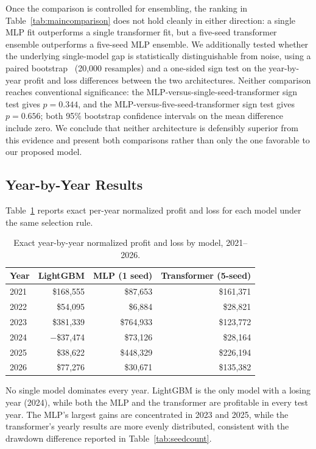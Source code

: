 \documentclass[sigconf,review,anonymous]{acmart}
\begin{document}
Once the comparison is controlled for ensembling, the ranking in Table~\ref{tab:maincomparison} does not hold cleanly in either direction: a single MLP fit outperforms a single transformer fit, but a five-seed transformer ensemble outperforms a five-seed MLP ensemble. We additionally tested whether the underlying single-model gap is statistically distinguishable from noise, using a paired bootstrap~\cite{efron1993bootstrap} (20{,}000 resamples) and a one-sided sign test on the year-by-year profit and loss differences between the two architectures. Neither comparison reaches conventional significance: the MLP-versus-single-seed-transformer sign test gives $p=0.344$, and the MLP-versus-five-seed-transformer sign test gives $p=0.656$; both 95\% bootstrap confidence intervals on the mean difference include zero. We conclude that neither architecture is defensibly superior from this evidence and present both comparisons rather than only the one favorable to our proposed model.

\subsection{Year-by-Year Results}
Table~\ref{tab:yearly} reports exact per-year normalized profit and loss for each model under the same selection rule.

\begin{table}[H]
\centering
\scriptsize
\begin{tabular}{lrrr}
\toprule
Year & LightGBM & MLP (1 seed) & Transformer (5-seed) \\
\midrule
2021 & \$168{,}555 & \$87{,}653 & \$161{,}371 \\
2022 & \$54{,}095 & \$6{,}884 & \$28{,}821 \\
2023 & \$381{,}339 & \$764{,}933 & \$123{,}772 \\
2024 & $-$\$37{,}474 & \$73{,}126 & \$28{,}164 \\
2025 & \$38{,}622 & \$448{,}329 & \$226{,}194 \\
2026 & \$77{,}276 & \$30{,}671 & \$135{,}382 \\
\bottomrule
\end{tabular}
\caption{Exact year-by-year normalized profit and loss by model, 2021--2026.}
\label{tab:yearly}
\end{table}

No single model dominates every year. LightGBM is the only model with a losing year (2024), while both the MLP and the transformer are profitable in every test year. The MLP's largest gains are concentrated in 2023 and 2025, while the transformer's yearly results are more evenly distributed, consistent with the drawdown difference reported in Table~\ref{tab:seedcount}.
\end{document}
